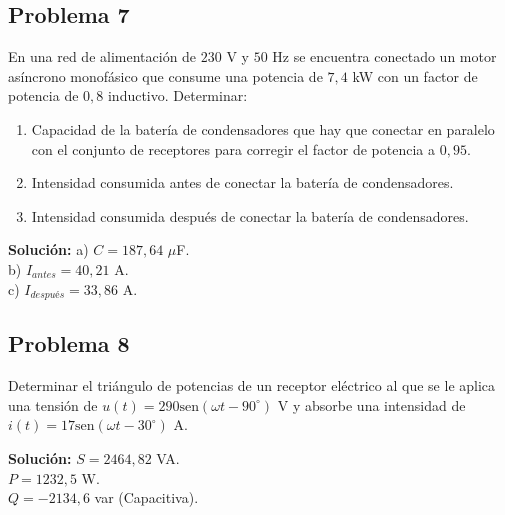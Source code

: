 \documentclass[
  a4paper,
  DIV=11,
  numbers=noendperiod]{scrreprt}
\providecommand{\tightlist}{%
  \setlength{\itemsep}{0pt}\setlength{\parskip}{0pt}}
\begin{document}
\subsection*{Problema 7}\label{problema-7}

En una red de alimentación de \(230\) V y \(50\) Hz se encuentra
conectado un motor asíncrono monofásico que consume una potencia de
\(7,4\) kW con un factor de potencia de \(0,8\) inductivo. Determinar:

\begin{enumerate}
\def\labelenumi{\alph{enumi})}
\tightlist
\item
  Capacidad de la batería de condensadores que hay que conectar en
  paralelo con el conjunto de receptores para corregir el factor de
  potencia a \(0,95\).
\item
  Intensidad consumida antes de conectar la batería de condensadores.
\item
  Intensidad consumida después de conectar la batería de condensadores.
\end{enumerate}

\begin{tcolorbox}[enhanced jigsaw, breakable, colback=white, left=2mm, leftrule=.75mm, rightrule=.15mm, toprule=.15mm, colframe=quarto-callout-note-color-frame, arc=.35mm, bottomrule=.15mm, opacityback=0]

\textbf{Solución:} a) \(C = 187,64\) \(\mu\)F.\\
b) \(I_{antes} = 40,21\) A.\\
c) \(I_{después} = 33,86\) A.

\end{tcolorbox}

\subsection*{Problema 8}\label{problema-8}

Determinar el triángulo de potencias de un receptor eléctrico al que se
le aplica una tensión de \(u(t)=290 \text{sen}(\omega t-90^{\circ})\) V
y absorbe una intensidad de \(i(t)=17 \text{sen}(\omega t-30^{\circ})\)
A.

\begin{tcolorbox}[enhanced jigsaw, breakable, colback=white, left=2mm, leftrule=.75mm, rightrule=.15mm, toprule=.15mm, colframe=quarto-callout-note-color-frame, arc=.35mm, bottomrule=.15mm, opacityback=0]

\textbf{Solución:} \(S = 2464,82\) VA.\\
\(P = 1232,5\) W.\\
\(Q = -2134,6\) var (Capacitiva).

\end{tcolorbox}
\end{document}
